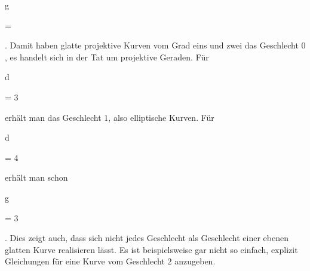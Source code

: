 {\mavergleichskettedisp

{\vergleichskette

{g
}

{ =} { {  }
}

{ } {
}

{ } {
}

{ } {
}

}
{}{}{.}
Damit haben glatte projektive Kurven vom Grad eins und zwei
 {} {}
das Geschlecht $0$, es handelt sich
 {} {}
in der Tat um projektive Geraden. Für


\mavergleichskette

{\vergleichskette

{d
}

{ = }{ 3
}

{  }{
}

{    }{
}

{   }{
}

}
{}{}{}
erhält man das Geschlecht $1$, also elliptische Kurven. Für


\mavergleichskette

{\vergleichskette

{d
}

{ = }{ 4
}

{  }{
}

{    }{
}

{   }{
}

}
{}{}{}
erhält man schon


\mavergleichskette

{\vergleichskette

{g
}

{ = }{ 3
}

{  }{
}

{    }{
}

{   }{
}

}
{}{}{.}
Dies zeigt auch, dass sich nicht jedes Geschlecht als Geschlecht einer ebenen glatten Kurve realisieren lässt. Es ist beispielsweise gar nicht so einfach, explizit Gleichungen für eine Kurve vom Geschlecht $2$ anzugeben.


}
